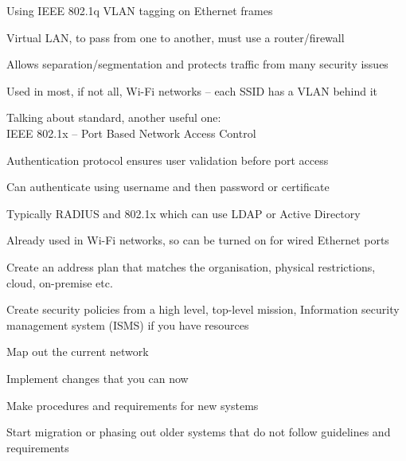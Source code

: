 \documentclass[Screen16to9,17pt]{foils}
\begin{document}


\begin{list1}
\item Using IEEE 802.1q  VLAN tagging on Ethernet frames
\item Virtual LAN, to pass from one to another, must use a router/firewall
\item Allows separation/segmentation and protects traffic from many security issues
\item Used in most, if not all, Wi-Fi networks -- each SSID has a VLAN behind it
\end{list1}





Talking about standard, another useful one:\\
IEEE 802.1x -- Port Based Network Access Control


\begin{list1}
\item Authentication protocol ensures user validation before port access
\item Can authenticate using username and then password or certificate
\item Typically RADIUS and 802.1x which can use LDAP or Active Directory
\item Already used in Wi-Fi networks, so can be turned on for wired Ethernet ports
\end{list1}




\begin{list2}
\item Create an address plan that matches the organisation, physical restrictions, cloud, on-premise etc.
\item Create security policies from a high level, top-level mission, Information security management system (ISMS) if you have resources
\item Map out the current network
\item Implement changes that you can now
\item Make procedures and requirements for new systems
\item Start migration or phasing out older systems that do not follow guidelines and requirements
\end{list2}
\end{document}
